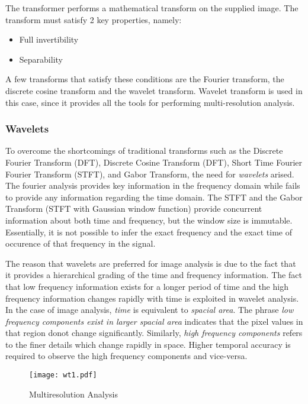 \documentclass[./A14_Report.tex]{subfiles}
\begin{document}
The transformer performs a mathematical transform on the supplied image. The
transform must satisfy 2 key properties, namely:
\begin{itemize}
    \item Full invertibility
    \item Separability
\end{itemize}

A few transforms that satisfy these conditions are the Fourier transform, the
discrete cosine transform and the wavelet transform. Wavelet transform is used
in this case, since it provides all the tools for performing multi-resolution
analysis.

\subsubsection{Wavelets}%
\label{sec:theory_of_wavelets}

To overcome the shortcomings of traditional transforms such as the Discrete
Fourier Transform (DFT), Discrete Cosine Transform (DFT), Short Time Fourier
Fourier Transform (STFT), and Gabor Transform, the need for \textit{wavelets}
arised. The fourier analysis provides key information in the frequency domain
while fails to provide any information regarding the time domain.  The STFT and
the Gabor Transform (STFT with Gaussian window function) provide concurrent
information about both time and frequency, but the window size is immutable.
Essentially, it is not possible to infer the exact frequency and the exact time
of occurence of that frequency in the signal.

\par

The reason that wavelets are preferred for image analysis is due to the fact
that it provides a hierarchical grading of the time and frequency information.
The fact that low frequency information exists for a longer period of time and
the high frequency information changes rapidly with time is exploited in
wavelet analysis. In the case of image analysis, \textit{time} is equivalent to
\textit{spacial area}. The phrase \textit{low frequency components exist in
larger spacial area} indicates that the pixel values in that region donot
change significantly. Similarly, \textit{high frequency components} refers to
the finer details which change rapidly in space.  Higher temporal accuracy is
required to observe the high frequency components and vice-versa.

\FloatBarrier
\begin{figure}[htpb]
    \centering
    \texttt{[image: wt1.pdf]}
    \caption{Multiresolution Analysis}%
    \label{fig:multiresolution}
\end{figure}
\FloatBarrier
\end{document}
